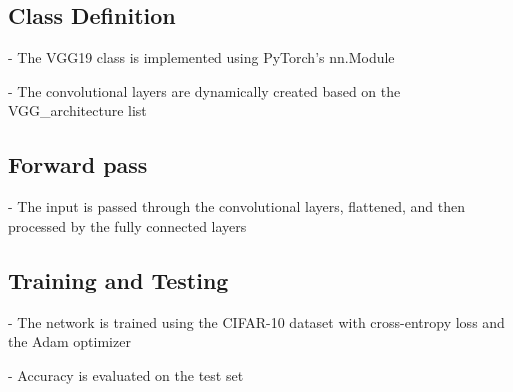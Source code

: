 \documentclass{article}
\begin{document}
\subsection{Class Definition}

- The VGG19 class is implemented using PyTorch's nn.Module

- The convolutional layers are dynamically created based on the VGG\_architecture list

\subsection{Forward pass}
- The input is passed through the convolutional layers, flattened, and then processed by the fully connected layers

\subsection{Training and Testing}
- The network is trained using the CIFAR-10 dataset with cross-entropy loss and the Adam optimizer

- Accuracy is evaluated on the test set
\end{document}
